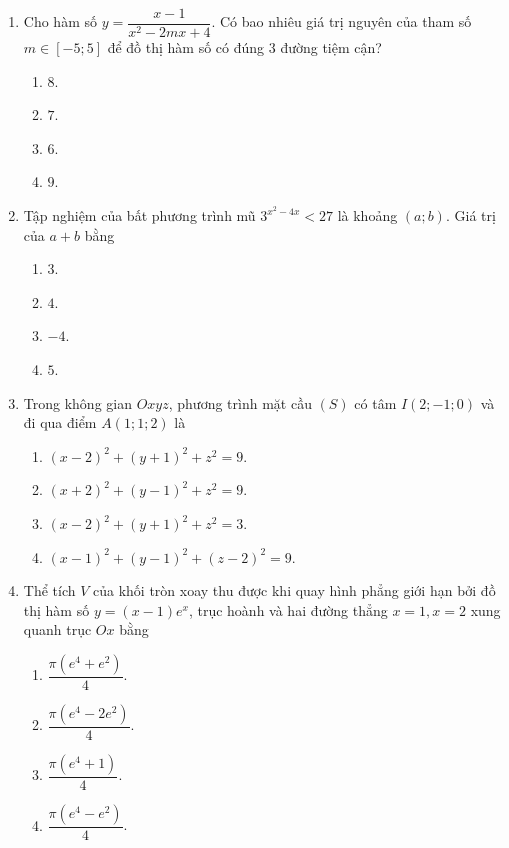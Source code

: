 \documentclass[12pt,a4paper]{article}
\begin{document}
\begin{enumerate}[label=\textbf{Câu \arabic*:}, leftmargin=*]
\item Cho hàm số $y = \dfrac{x - 1}{x^2 - 2mx + 4}$. Có bao nhiêu giá trị nguyên của tham số $m \in [-5; 5]$ để đồ thị hàm số có đúng $3$ đường tiệm cận?
\begin{enumerate}[label=\Alph*.]
    \item $8$.
    \item $7$.
    \item $6$.
    \item $9$.
\end{enumerate}

\item Tập nghiệm của bất phương trình mũ $3^{x^2 - 4x} < 27$ là khoảng $(a; b)$. Giá trị của $a + b$ bằng
\begin{enumerate}[label=\Alph*.]
    \item $3$.
    \item $4$.
    \item $-4$.
    \item $5$.
\end{enumerate}

\item Trong không gian $Oxyz$, phương trình mặt cầu $(S)$ có tâm $I(2; -1; 0)$ và đi qua điểm $A(1; 1; 2)$ là
\begin{enumerate}[label=\Alph*.]
    \item $(x - 2)^2 + (y + 1)^2 + z^2 = 9$.
    \item $(x + 2)^2 + (y - 1)^2 + z^2 = 9$.
    \item $(x - 2)^2 + (y + 1)^2 + z^2 = 3$.
    \item $(x - 1)^2 + (y - 1)^2 + (z - 2)^2 = 9$.
\end{enumerate}

\item Thể tích $V$ của khối tròn xoay thu được khi quay hình phẳng giới hạn bởi đồ thị hàm số $y = (x-1)e^x$, trục hoành và hai đường thẳng $x = 1, x = 2$ xung quanh trục $Ox$ bằng
\begin{enumerate}[label=\Alph*.]
    \item $\dfrac{\pi(e^4 + e^2)}{4}$.
    \item $\dfrac{\pi(e^4 - 2e^2)}{4}$.
    \item $\dfrac{\pi(e^4 + 1)}{4}$.
    \item $\dfrac{\pi(e^4 - e^2)}{4}$.
\end{enumerate}

\end{enumerate}

\end{document}

